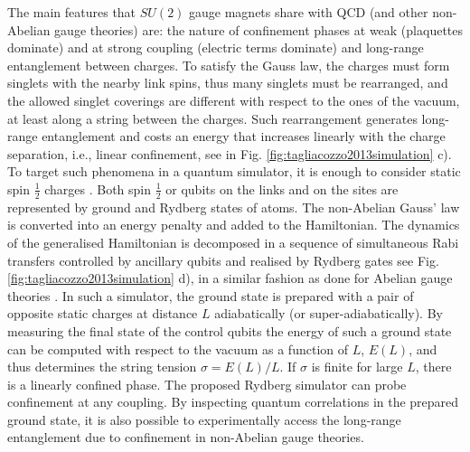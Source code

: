 \documentclass[epj,final]{svjour}
\begin{document}
The main features that $SU(2)$ gauge magnets share with QCD (and other non-Abelian gauge theories) are: the nature of confinement phases at weak (plaquettes dominate) and at strong coupling (electric terms dominate) and long-range entanglement between charges. To satisfy the Gauss law, the charges must form singlets with the nearby link spins, thus many singlets must be rearranged, and the allowed singlet coverings are different with respect to the ones of the vacuum, at least along a string between the charges. Such rearrangement generates long-range entanglement and costs an energy that increases linearly with the charge separation, i.e., linear confinement, see in Fig. \ref{fig:tagliacozzo2013simulation} c).    
To target such phenomena in a quantum simulator, it is enough to consider static spin $\frac 12$ charges \cite{tagliacozzo2013simulation}. Both spin $\frac 12$ or qubits on the links and on the sites are represented by ground and Rydberg states of atoms. The non-Abelian Gauss' law is converted into an energy penalty and added to the Hamiltonian. The dynamics of the generalised Hamiltonian is decomposed in a sequence of simultaneous Rabi transfers controlled by ancillary qubits and realised by Rydberg gates \cite{Mueller2009} see Fig. \ref{fig:tagliacozzo2013simulation} d), in a similar fashion as done for Abelian gauge theories \cite{weimer2010rydberg,tagliacozzo2013optical}.
In such a simulator, the ground state is prepared with a pair of opposite static charges at distance $L$ adiabatically (or super-adiabatically). By measuring the final state of the control qubits the energy of such a ground state can be computed with respect to the vacuum as a function of $L$, $E(L)$, and thus determines the string tension $\sigma=E(L)/L$. If $\sigma$ is finite for large $L$, there is a linearly confined phase.  The proposed Rydberg simulator can probe confinement at any coupling. By inspecting quantum correlations in the prepared ground state, it is also possible to experimentally access the long-range entanglement due to confinement in non-Abelian gauge theories. 
\end{document}

